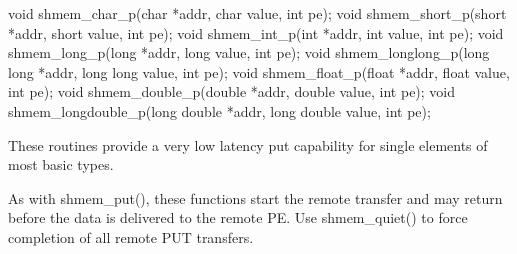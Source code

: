 \synC 
void shmem_char_p(char *addr, char value, int pe);
void shmem_short_p(short *addr, short value, int pe);
void shmem_int_p(int *addr, int value, int pe);
void shmem_long_p(long *addr, long value, int pe);
void shmem_longlong_p(long long *addr, long long value, int pe);
void shmem_float_p(float *addr, float value, int pe);
void shmem_double_p(double *addr, double value, int pe);
void shmem_longdouble_p(long double *addr, long double value, int pe);

{     These routines provide a very low latency  put  capability  for single
       elements of most basic types.

       As with shmem\_put(), these functions start the remote transfer and may
       return	before the   data  is delivered  to the  remote PE.  Use
       shmem\_quiet() to force completion of all remote PUT transfers.
}
{
\notesB{}
}
\eAPI